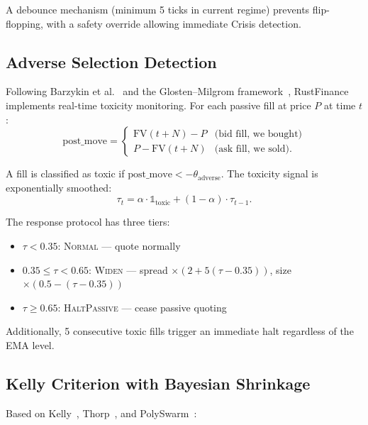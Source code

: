 \documentclass[11pt]{article}
\theoremstyle{definition}
\begin{document}
A debounce mechanism (minimum 5 ticks in current regime) prevents
flip-flopping, with a safety override allowing immediate Crisis
detection.

\subsection{Adverse Selection Detection}
\label{sec:adverse}

Following Barzykin et al.~\cite{barzykin2025} and the
Glosten--Milgrom framework~\cite{glosten1985}, RustFinance
implements real-time toxicity monitoring. For each passive fill at
price $P$ at time $t$:
\begin{equation}
  \text{post\_move} = \begin{cases}
    \text{FV}(t+N) - P & \text{(bid fill, we bought)} \\
    P - \text{FV}(t+N) & \text{(ask fill, we sold)}.
  \end{cases}
  \label{eq:toxicity-move}
\end{equation}

A fill is classified as toxic if
$\text{post\_move} < -\theta_{\text{adverse}}$. The toxicity
signal is exponentially smoothed:
\begin{equation}
  \tau_t = \alpha \cdot \mathbb{1}_{\text{toxic}} +
           (1-\alpha) \cdot \tau_{t-1}.
  \label{eq:toxicity-ema}
\end{equation}

The response protocol has three tiers:
\begin{itemize}[leftmargin=*,topsep=2pt,itemsep=1pt]
  \item $\tau < 0.35$: \textsc{Normal} --- quote normally
  \item $0.35 \leq \tau < 0.65$: \textsc{Widen} --- spread $\times
        (2 + 5(\tau - 0.35))$, size $\times (0.5 - (\tau - 0.35))$
  \item $\tau \geq 0.65$: \textsc{HaltPassive} --- cease passive quoting
\end{itemize}

Additionally, 5 consecutive toxic fills trigger an immediate halt
regardless of the EMA level.

\subsection{Kelly Criterion with Bayesian Shrinkage}
\label{sec:kelly}

Based on Kelly~\cite{kelly1956}, Thorp~\cite{thorp2008}, and
PolySwarm~\cite{polyswarm2026}:
\end{document}
